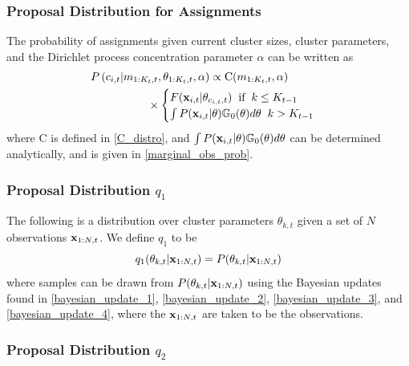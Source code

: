 \documentclass[twocolumn, final]{svjour3}
\begin{document}
\subsubsection{Proposal Distribution for Assignments}
\label{sec:smc_proposal_1}

The probability of assignments given current cluster sizes, cluster parameters, and the Dirichlet process concentration parameter $\alpha$ can be written as
\begin{align}
\begin{split}
\label{smc_assig_eqn}
P &\left( c_{i,t} | m_{1:K_{t}, t}, \theta_{1:K_{t}, t}, \alpha \right) \propto
\text{C}(m_{1:K_{t}, t}, \alpha) \\ 
& \hspace{15mm}\times
\begin{cases}
F(\bold{x}_{i,t} | \theta_{c_{i,t},t}) \hspace{2mm} \text{if} \hspace{2mm} k \leq K_{t-1} \\
\int P(\bold{x}_{i,t} | \theta) \mathbb{G}_{0}(\theta)d\theta \hspace{2mm} k > K_{t-1}
\end{cases}
\end{split}
\end{align}
where C is defined in \eqref{C_distro}, and
$\int P(\bold{x}_{i,t} | \theta) \mathbb{G}_{0}(\theta)d\theta$ can be determined analytically, and is given in \eqref{marginal_obs_prob}.


\subsubsection{Proposal Distribution $q_{1}$}
\label{sec:smc_proposal_2}

The following is a distribution over cluster parameters $\theta_{k,t}$ given a set of $N$ observations $\bold{x}_{1:N, t}$. We define $q_{1}$ to be
\begin{equation}
\label{smc_q1_eqn}
q_{1}(\theta_{k,t} | \bold{x}_{1:N,t}) = P(\theta_{k,t} | \bold{x}_{1:N,t})
\end{equation}
where samples can be drawn from $P(\theta_{k,t} | \bold{x}_{1:N,t})$ using the Bayesian updates found in \eqref{bayesian_update_1}, \eqref{bayesian_update_2}, \eqref{bayesian_update_3}, and \eqref{bayesian_update_4}, where the $\bold{x}_{1:N,t}$ are taken to be the observations.


\subsubsection{Proposal Distribution $q_{2}$}
\label{sec:smc_proposal_3}
\end{document}
